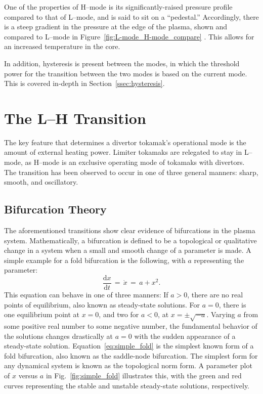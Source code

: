 One of the properties of H--mode is its significantly-raised pressure profile compared to that of L--mode, and is said to sit on a ``pedestal.''
Accordingly, there is a steep gradient in the pressure at the edge of the plasma, shown and compared to L--mode in Figure~\ref{fig:L-mode_H-mode_compare} \cite{weymiens_bifurcation_2014}.
This allows for an increased temperature in the core.

In addition, hysteresis is present between the modes, in which the threshold power for the transition between the two modes is based on the current mode.
This is covered in-depth in Section~\ref{ssec:hysteresis}.

\section{The L--H Transition}\label{sec:the_transition}
The key feature that determines a divertor tokamak's operational mode is the amount of external heating power.
Limiter tokamaks are relegated to stay in L--mode, as H--mode is an exclusive operating mode of tokamaks with divertors.
The transition has been observed to occur in one of three general manners: sharp, smooth, and oscillatory.

\subsection{Bifurcation Theory}\label{ssec:bif_theory}
The aforementioned transitions show clear evidence of bifurcations in the plasma system.
Mathematically, a bifurcation is defined to be a topological or qualitative change in a system when a small and smooth change of a parameter is made.
A simple example for a fold bifurcation is the following, with $a$ representing the parameter:
\begin{equation} %
	\frac{\text{d}x}{\text{d}t} \,=\, \dot{x} \,=\, a + x^2.
	\label{eq:simple_fold}
\end{equation}
This equation can behave in one of three manners:
If $a > 0$, there are no real points of equilibrium, also known as steady-state solutions.
For $a = 0$, there is one equilibrium point at $x = 0$, and two for $a < 0$, at $x = \pm\sqrt{-a}$.
Varying $a$ from some positive real number to some negative number, the fundamental behavior of the solutions changes drastically at $a = 0$ with the sudden appearance of a steady-state solution.
Equation~\ref{eq:simple_fold} is the simplest known form of a fold bifurcation, also known as the saddle-node bifurcation.
The simplest form for any dynamical system is known as the topological norm form.
A parameter plot of $x$ versus $a$ in Fig.~\ref{fig:simple_fold} illustrates this, with the green and red curves representing the stable and unstable steady-state solutions, respectively.

